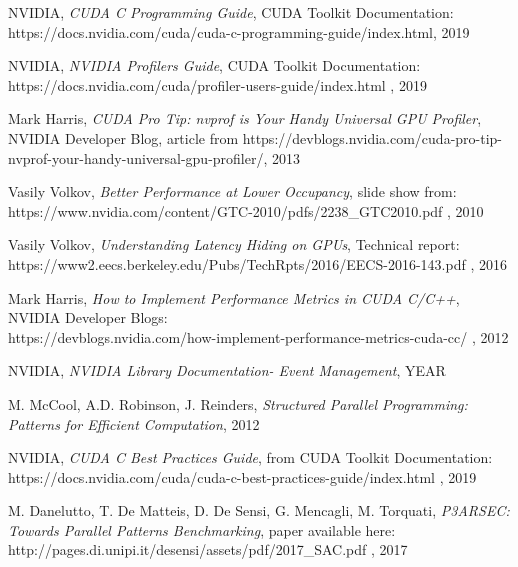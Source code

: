 \documentclass[12pt]{report}
\begin{document}
\begin{thebibliography}{9}
		 
		 
		NVIDIA, \textit{CUDA C Programming Guide}, CUDA Toolkit Documentation:\\
		https://docs.nvidia.com/cuda/cuda-c-programming-guide/index.html, 2019
		
		
		NVIDIA, \textit{NVIDIA Profilers Guide}, CUDA Toolkit Documentation:\\ https://docs.nvidia.com/cuda/profiler-users-guide/index.html , 2019 
		
		
		Mark Harris, 
		\textit{CUDA Pro Tip: nvprof is Your Handy Universal GPU Profiler}, NVIDIA Developer Blog, article from https://devblogs.nvidia.com/cuda-pro-tip-nvprof-your-handy-universal-gpu-profiler/, 2013
		
		Vasily Volkov,
		\textit{Better Performance at Lower Occupancy}, slide show from:\\ https://www.nvidia.com/content/GTC-2010/pdfs/2238\_GTC2010.pdf , 2010
		
		
		Vasily Volkov, \textit{Understanding Latency Hiding on GPUs}, Technical report:\\
		https://www2.eecs.berkeley.edu/Pubs/TechRpts/2016/EECS-2016-143.pdf , 2016
		
		
		Mark Harris, \textit{How to Implement Performance Metrics in CUDA C/C++}, NVIDIA Developer Blogs:  \\
		https://devblogs.nvidia.com/how-implement-performance-metrics-cuda-cc/ , 2012 
		
		NVIDIA, \textit{NVIDIA Library Documentation- Event Management}, YEAR
		
		M. McCool, A.D. Robinson, J. Reinders, \textit{Structured Parallel Programming: Patterns for Efficient Computation}, 2012
		
		NVIDIA, \textit{CUDA C Best Practices Guide}, from CUDA Toolkit Documentation:\\
		https://docs.nvidia.com/cuda/cuda-c-best-practices-guide/index.html , 2019
		
		M. Danelutto, T. De Matteis, D. De Sensi, G. Mencagli, M. Torquati, \textit{P3ARSEC: Towards Parallel Patterns Benchmarking}, paper available here:\\
		http://pages.di.unipi.it/desensi/assets/pdf/2017\_SAC.pdf , 2017
		

\end{thebibliography}
\end{document}
